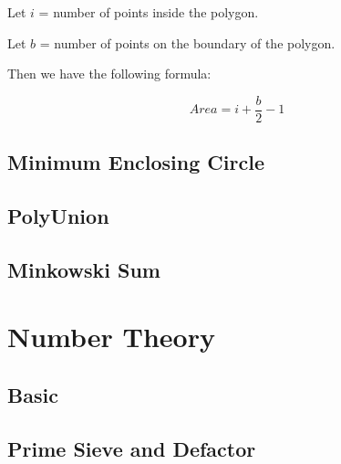 \documentclass[a4paper,10pt,twocolumn,oneside]{article}
\begin{document}
Let $i$ = number of points inside the polygon.

Let $b$ = number of points on the boundary of the polygon.

Then we have the following formula:

$$
Area = i + \frac{b}{2} - 1
$$

\subsection{Minimum Enclosing Circle}


% 

\subsection{PolyUnion}


% 

\subsection{Minkowski Sum}







\section{Number Theory}

\subsection{Basic}


\subsection{Prime Sieve and Defactor}

\end{document}
